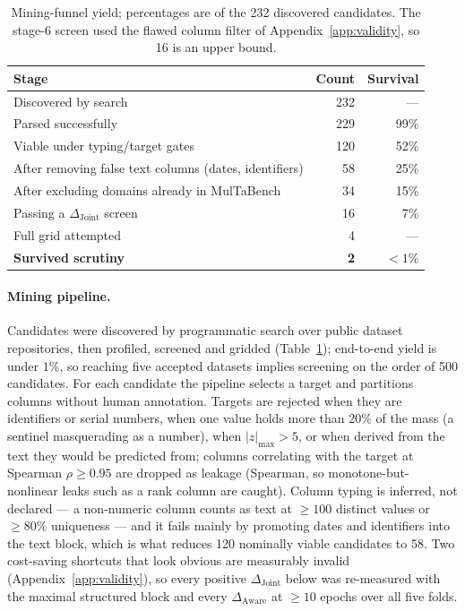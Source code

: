 \documentclass[10pt,letterpaper]{article}
\newcommand{\dj}{\Delta_{\mathrm{Joint}}}
\newcommand{\da}{\Delta_{\mathrm{Aware}}}
\begin{document}
\begin{table}[t]
\centering
\small
\caption{Mining-funnel yield; percentages are of the 232 discovered candidates. The stage-6
screen used the flawed column filter of Appendix~\ref{app:validity}, so 16 is an upper bound.}
\label{tab:funnel}
\begin{tabular}{lrr}
\toprule
Stage & Count & Survival \\
\midrule
Discovered by search & 232 & --- \\
Parsed successfully & 229 & 99\% \\
Viable under typing/target gates & 120 & 52\% \\
After removing false text columns (dates, identifiers) & 58 & 25\% \\
After excluding domains already in MulTaBench & 34 & 15\% \\
Passing a $\dj$ screen & 16 & 7\% \\
Full grid attempted & 4 & --- \\
\textbf{Survived scrutiny} & \textbf{2} & \textbf{$<1\%$} \\
\bottomrule
\end{tabular}
\end{table}

\paragraph{Mining pipeline.} Candidates were discovered by programmatic search over public
dataset repositories, then profiled, screened and gridded (Table~\ref{tab:funnel}); end-to-end
yield is under $1\%$, so reaching five accepted datasets implies screening on the order of 500
candidates. For each candidate the pipeline selects a target and partitions columns without
human annotation. Targets are rejected when they are identifiers or serial numbers, when one
value holds more than $20\%$ of the mass (a sentinel masquerading as a number), when
$|z|_{\max} > 5$, or when derived from the text they would be predicted from; columns
correlating with the target at Spearman $\rho \ge 0.95$ are dropped as leakage (Spearman, so
monotone-but-nonlinear leaks such as a rank column are caught). Column typing is inferred, not
declared --- a non-numeric column counts as text at $\ge 100$ distinct values or $\ge 80\%$
uniqueness --- and it fails mainly by promoting dates and identifiers into the text block,
which is what reduces 120 nominally viable candidates to 58. Two cost-saving shortcuts that
look obvious are measurably invalid (Appendix~\ref{app:validity}), so every positive $\dj$
below was re-measured with the maximal structured block and every $\da$ at $\ge 10$ epochs
over all five folds.
\end{document}
